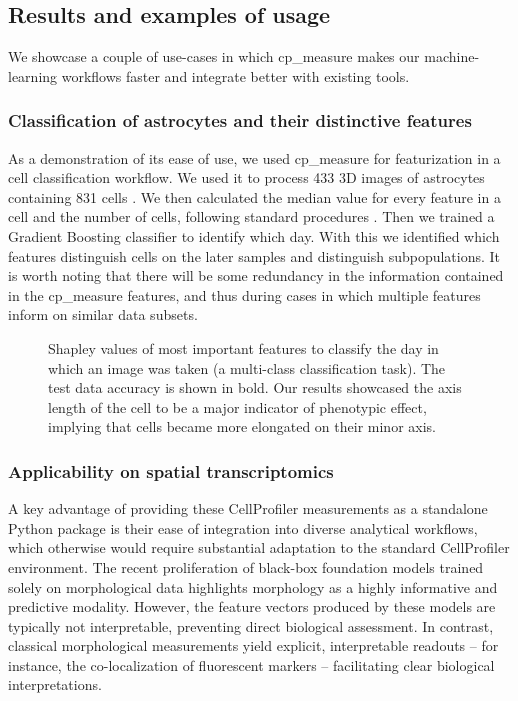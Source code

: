 \documentclass{article}
\begin{document}
\subsection{Results and examples of usage}
\label{sec:orgc72999e}
We showcase a couple of use-cases in which cp\_measure makes our machine-learning workflows faster and integrate better with existing tools.
\subsubsection{Classification of astrocytes and their distinctive features}
\label{sec:org0622674}

As a demonstration of its ease of use, we used cp\_measure for featurization in a cell classification workflow. We used it to process 433 3D images of astrocytes containing 831 cells \citep{kalinin3DCellNuclear2018}. We then calculated the median value for every feature in a cell and the number of cells, following standard procedures \citep{caicedoDataanalysisStrategiesImagebased2017}. Then we trained a Gradient Boosting classifier to identify which day. With this we identified which features distinguish cells on the later samples and distinguish subpopulations. It is worth noting that there will be some redundancy in the information contained in the cp\_measure features, and thus during cases in which multiple features inform on similar data subsets.

\begin{figure}[htbp]
\centering

\caption{\label{fig:astrocytes}Shapley values of most important features to classify the day in which an image was taken (a multi-class classification task). The test data accuracy is shown in bold. Our results showcased the axis length of the cell to be a major indicator of phenotypic effect, implying that cells became more elongated on their minor axis.}
\end{figure}
\subsubsection{Applicability on spatial transcriptomics}
\label{sec:org6a1cdc5}
A key advantage of providing these CellProfiler measurements as a standalone Python package is their ease of integration into diverse analytical workflows, which otherwise would require substantial adaptation to the standard CellProfiler environment. The recent proliferation of black-box foundation models trained solely on morphological data highlights morphology as a highly informative and predictive modality. However, the feature vectors produced by these models are typically not interpretable, preventing direct biological assessment. In contrast, classical morphological measurements yield explicit, interpretable readouts -- for instance, the co-localization of fluorescent markers -- facilitating clear biological interpretations.
\end{document}
